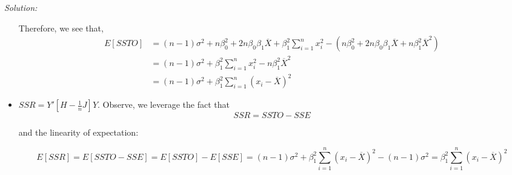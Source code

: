 \documentclass{article}
\newenvironment{problem}[2][Problem]
    { \begin{mdframed}[backgroundcolor=gray!20] \textbf{#1 #2} \\}
    {  \end{mdframed}}
\newenvironment{solution}
    {\textit{Solution:}}
    {}
\begin{document}
\begin{solution}
\begin{itemize}
Therefore, we see that, 
\begin{align*}
E[SSTO]  &= (n -1)\sigma^2 + n \beta_0^2 + 2 n \beta_0 \beta_1 \overline{X} + \beta_1^2 \sum_{i = 1}^n x_i^2 - ( n \beta_0^2 +  2 n \beta_0 \beta_1 \overline{X} + n \beta_1^2 \overline{X}^2) \\
&= (n -1)\sigma^2 + \beta_1^2 \sum_{i = 1}^n x_i^2 - n \beta_1^2 \overline{X}^2\\
&= (n -1)\sigma^2 + \beta_1^2 \sum_{i = 1}^n (x_i - \overline{X})^2
\end{align*}
\item  $SSR = Y' \left [H - \frac{1}{n}J \right ] Y$. Observe, we leverage the fact that 
$$SSR = SSTO - SSE$$

and the linearity of expectation: 

$$E[SSR] = E[SSTO - SSE] =  E[SSTO] - E[SSE] = (n -1)\sigma^2 + \beta_1^2 \sum_{i = 1}^n (x_i - \overline{X})^2 - (n - 1) \sigma^2 = \beta_1^2 \sum_{i = 1}^n (x_i - \overline{X})^2$$
\end{itemize}
\end{solution}

\end{document}
